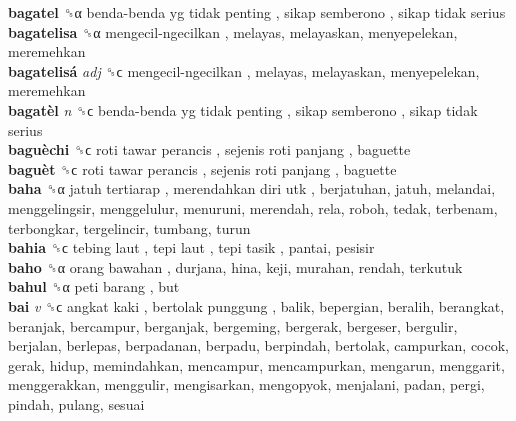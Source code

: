 \textbf{bagatel} ␝α   benda-benda yg tidak penting ,  sikap semberono ,  sikap tidak serius   \\
\textbf{bagatelisa} ␝α   mengecil-ngecilkan , melayas, melayaskan, menyepelekan, meremehkan  \\
\textbf{bagatelisá} \emph{adj}  ␝ϲ   mengecil-ngecilkan , melayas, melayaskan, menyepelekan, meremehkan  \\
\textbf{bagatèl} \emph{n}  ␝ϲ   benda-benda yg tidak penting ,  sikap semberono ,  sikap tidak serius   \\
\textbf{baguèchi} ␝ϲ   roti tawar perancis ,  sejenis roti panjang , baguette  \\
\textbf{baguèt} ␝ϲ   roti tawar perancis ,  sejenis roti panjang , baguette  \\
\textbf{baha} ␝α   jatuh tertiarap ,  merendahkan diri utk , berjatuhan, jatuh, melandai, menggelingsir, menggelulur, menuruni, merendah, rela, roboh, tedak, terbenam, terbongkar, tergelincir, tumbang, turun  \\
\textbf{bahia} ␝ϲ   tebing laut ,  tepi laut ,  tepi tasik , pantai, pesisir  \\
\textbf{baho} ␝α   orang bawahan , durjana, hina, keji, murahan, rendah, terkutuk  \\
\textbf{bahul} ␝α   peti barang , but  \\
\textbf{bai} \emph{v}  ␝ϲ   angkat kaki ,  bertolak punggung , balik, bepergian, beralih, berangkat, beranjak, bercampur, berganjak, bergeming, bergerak, bergeser, bergulir, berjalan, berlepas, berpadanan, berpadu, berpindah, bertolak, campurkan, cocok, gerak, hidup, memindahkan, mencampur, mencampurkan, mengarun, menggarit, menggerakkan, menggulir, mengisarkan, mengopyok, menjalani, padan, pergi, pindah, pulang, sesuai  \\
